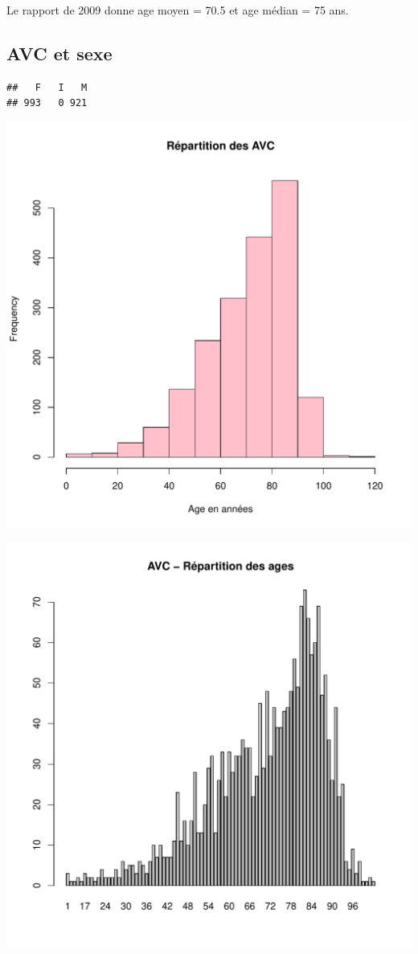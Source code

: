 \documentclass[12pt,english,french,twoside]{report}\usepackage[]{graphicx}\usepackage[]{color}
\makeatletter
\def\maxwidth{ %
  \ifdim\Gin@nat@width>\linewidth
    \linewidth
  \else
    \Gin@nat@width
  \fi
}
\newenvironment{kframe}{%
 \def\at@end@of@kframe{}%
 \ifinner\ifhmode%
  \def\at@end@of@kframe{\end{minipage}}%
  \begin{minipage}{\columnwidth}%
 \fi\fi%
 \def\FrameCommand##1{\hskip\@totalleftmargin \hskip-\fboxsep
 \colorbox{shadecolor}{##1}\hskip-\fboxsep
     \hskip-\linewidth \hskip-\@totalleftmargin \hskip\columnwidth}%
 \MakeFramed {\advance\hsize-\width
   \@totalleftmargin\z@ \linewidth\hsize
   \@setminipage}}%
 {\par\unskip\endMakeFramed%
 \at@end@of@kframe}
\newenvironment{knitrout}{}{} %
\makeatother
\begin{document}
Le rapport de 2009 donne age moyen = 70.5 et age médian = 75 ans.

\subsection*{AVC et sexe}
\begin{knitrout}
\color{fgcolor}\begin{kframe}
\begin{verbatim}
##   F   I   M 
## 993   0 921
\end{verbatim}
\end{kframe}
\includegraphics[width=\maxwidth]{figure/avc_sexe1} 

\includegraphics[width=\maxwidth]{figure/avc_sexe2} 


\end{knitrout}
\end{document}
